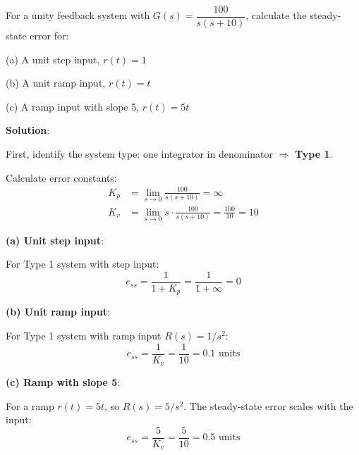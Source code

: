 \begin{examplebox}
For a unity feedback system with $G(s) = \dfrac{100}{s(s+10)}$, calculate the steady-state error for:

(a) A unit step input, $r(t) = 1$

(b) A unit ramp input, $r(t) = t$

(c) A ramp input with slope 5, $r(t) = 5t$

\textbf{Solution}:

First, identify the system type: one integrator in denominator $\Rightarrow$ \textbf{Type 1}.

Calculate error constants:
\begin{align}
    K_p &= \lim_{s\to 0} \frac{100}{s(s+10)} = \infty \\
    K_v &= \lim_{s\to 0} s \cdot \frac{100}{s(s+10)} = \frac{100}{10} = 10
\end{align}

\textbf{(a) Unit step input}:

For Type 1 system with step input:
\begin{equation}
    e_{ss} = \frac{1}{1 + K_p} = \frac{1}{1 + \infty} = \boxed{0}
\end{equation}

\textbf{(b) Unit ramp input}:

For Type 1 system with ramp input $R(s) = 1/s^2$:
\begin{equation}
    e_{ss} = \frac{1}{K_v} = \frac{1}{10} = \boxed{0.1 \text{ units}}
\end{equation}

\textbf{(c) Ramp with slope 5}:

For a ramp $r(t) = 5t$, so $R(s) = 5/s^2$. The steady-state error scales with the input:
\begin{equation}
    e_{ss} = \frac{5}{K_v} = \frac{5}{10} = \boxed{0.5 \text{ units}}
\end{equation}
\end{examplebox}

\vspace{1em}

